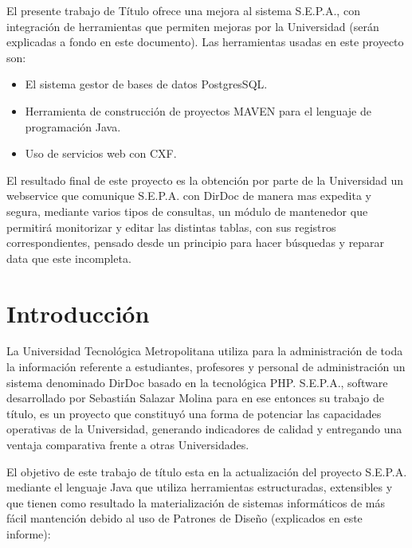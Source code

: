 \documentclass[a4paper,12pt,openany,oneside]{book}
\begin{document}

El presente trabajo de Título ofrece una mejora al sistema S.E.P.A., con integración de herramientas que permiten mejoras por la Universidad (serán explicadas a fondo en este documento). Las herramientas usadas en este proyecto son: 

\begin{itemize}
	\item El sistema gestor de bases de datos PostgresSQL.
	\item Herramienta de construcción de proyectos MAVEN para el lenguaje de programación Java.
	\item Uso de servicios web con CXF.
\end{itemize}

El resultado final de este proyecto es la obtención por parte de la Universidad un webservice que comunique S.E.P.A. con DirDoc de manera mas expedita y segura, mediante varios tipos de consultas, un módulo de mantenedor que permitirá monitorizar y editar las distintas tablas, con sus registros correspondientes, pensado desde un principio para hacer búsquedas y reparar data que este incompleta.

\tableofcontents
\listoffigures
\chapter*{Introducción}
\thispagestyle{empty}
La Universidad Tecnológica Metropolitana utiliza para la administración de toda la información referente a estudiantes, profesores y personal de administración un sistema denominado DirDoc basado en la tecnológica PHP. S.E.P.A., software desarrollado por Sebastián Salazar Molina para en ese entonces su trabajo de título, es un proyecto que constituyó una forma de potenciar las capacidades operativas de la Universidad, generando indicadores de calidad y entregando una ventaja comparativa frente a otras Universidades.

El objetivo de este trabajo de título esta en la actualización del proyecto S.E.P.A. mediante el lenguaje Java que utiliza herramientas estructuradas, extensibles y que tienen como resultado la materialización de sistemas informáticos de más fácil mantención debido al uso de Patrones de Diseño (explicados en este informe):
\end{document}
